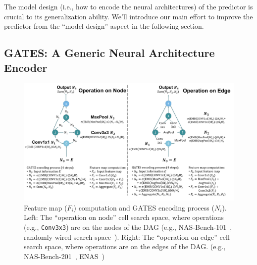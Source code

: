 \documentclass[runningheads]{llncs}
\begin{document}
The model design (i.e., how to encode the neural architectures) of the predictor is crucial to its generalization ability.
We'll introduce our main effort to improve the predictor from the ``model design'' aspect in the following section.

\subsection{GATES: A Generic Neural Architecture Encoder}
\label{sec:method-gates}


\begin{figure}[tb]
\includegraphics[width=1.0\linewidth]{figs/two_ss_post1.pdf}
\caption{Feature map ($F_i$) computation and GATES encoding process ($N_i$). Left: The ``operation on node'' cell search space, where operations (e.g., \texttt{Conv3x3}) are on the nodes of the DAG (e.g., NAS-Bench-101~\cite{ying2019bench}, randomly wired search space~\cite{xie2019exploring}). Right: The ``operation on edge'' cell search space, where operations are on the edges of the DAG. (e.g., NAS-Bench-201~\cite{Dong2020NAS-Bench-201}, ENAS~\cite{pham2018efficient})}
\label{fig:two_search_space}
\vspace{-10pt}
\end{figure}
\end{document}
